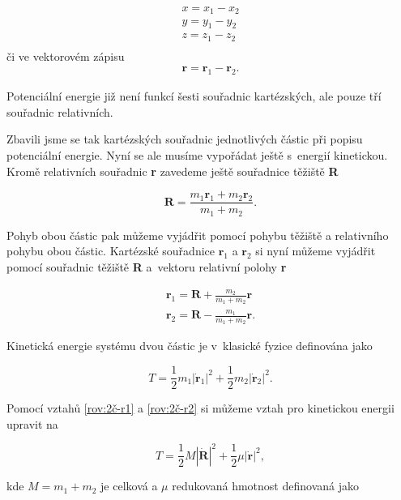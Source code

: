 \begin{eqnarray*}
x=x_{1}-x_{2}\\
y=y_{1}-y_{2}\\
z=z_{1}-z_{2}\\
\end{eqnarray*}
\noindent či ve vektorovém zápisu
\begin{eqnarray*}
\textbf{r}=\textbf{r}_{1}-\textbf{r}_{2}.
\end{eqnarray*}

Potenciální energie již není funkcí šesti souřadnic kartézských, ale pouze tří souřadnic relativních.
 
Zbavili jsme se tak kartézských souřadnic jednotlivých částic při popisu potenciální energie. Nyní se ale musíme vypořádat ještě s~energií kinetickou. Kromě relativních souřadnic \textbf{r} zavedeme ještě souřadnice těžiště \textbf{R} 

\begin{equation}
\textbf{R}=\frac{m_{1}\textbf{r}_{1}+m_{2}\textbf{r}_{2}}{m_{1}+m_{2}}.
\label{rov:2č-těžiště}
\end{equation}

Pohyb obou částic pak můžeme vyjádřit pomocí pohybu těžiště a relativního pohybu obou částic. Kartézské souřadnice $\textbf{r}_{1}$ a $\textbf{r}_{2}$ si nyní můžeme vyjádřit pomocí souřadnic těžiště \textbf{R} a~vektoru relativní polohy \textbf{r}

\begin{eqnarray}
\textbf{r}_{1}=\textbf{R}+\frac{m_{2}}{m_{1}+m_{2}}\textbf{r}
\label{rov:2č-r1}\\
\textbf{r}_{2}=\textbf{R}-\frac{m_{1}}{m_{1}+m_{2}}\textbf{r}.
\label{rov:2č-r2}
\end{eqnarray}

\noindent Kinetická energie systému dvou částic je v~klasické fyzice definována jako

\begin{equation}
T=\frac{1}{2}m_{1}|\dot{\textbf{r}}_{1}|^{2}+\frac{1}{2}m_{2}|\dot{\textbf{r}}_{2}|^{2}.
\end{equation}

\noindent Pomocí vztahů \eqref{rov:2č-r1} a \eqref{rov:2č-r2} si můžeme vztah pro kinetickou energii upravit na 

\begin{equation}
T=\frac{1}{2}M|\dot{\textbf{R}}|^{2}+\frac{1}{2}\mu| \dot{\textbf{r}}|^{2},
\label{rov:2č-Tmmu}
\end{equation}

\noindent kde $ M=m_{1}+m_{2} $ je celková a $ \mu $ redukovaná hmotnost definovaná jako

